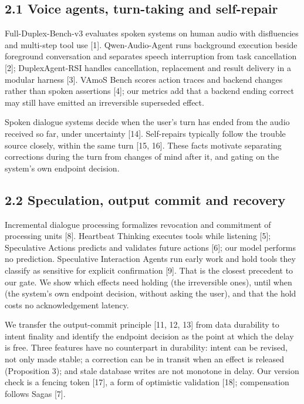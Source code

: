 \documentclass[review,12pt]{elsarticle}
\begin{document}
\subsection*{2.1 Voice agents, turn-taking and self-repair}

Full-Duplex-Bench-v3 evaluates spoken systems on human audio with disfluencies and multi-step tool use [1]. Qwen-Audio-Agent runs background execution beside foreground conversation and separates speech interruption from task cancellation [2]; DuplexAgent-RSI handles cancellation, replacement and result delivery in a modular harness [3]. VAmoS Bench scores action traces and backend changes rather than spoken assertions [4]; our metrics add that a backend ending correct may still have emitted an irreversible superseded effect.


Spoken dialogue systems decide when the user's turn has ended from the audio received so far, under uncertainty [14]. Self-repairs typically follow the trouble source closely, within the same turn [15, 16]. These facts motivate separating corrections during the turn from changes of mind after it, and gating on the system's own endpoint decision.


\subsection*{2.2 Speculation, output commit and recovery}

Incremental dialogue processing formalizes revocation and commitment of processing units [8]. Heartbeat Thinking executes tools while listening [5]; Speculative Actions predicts and validates future actions [6]; our model performs no prediction. Speculative Interaction Agents run early work and hold tools they classify as sensitive for explicit confirmation [9]. That is the closest precedent to our gate. We show which effects need holding (the irreversible ones), until when (the system's own endpoint decision, without asking the user), and that the hold costs no acknowledgement latency.


We transfer the output-commit principle [11, 12, 13] from data durability to intent finality and identify the endpoint decision as the point at which the delay is free. Three features have no counterpart in durability: intent can be revised, not only made stable; a correction can be in transit when an effect is released (Proposition 3); and stale database writes are not monotone in delay. Our version check is a fencing token [17], a form of optimistic validation [18]; compensation follows Sagas [7].
\end{document}
